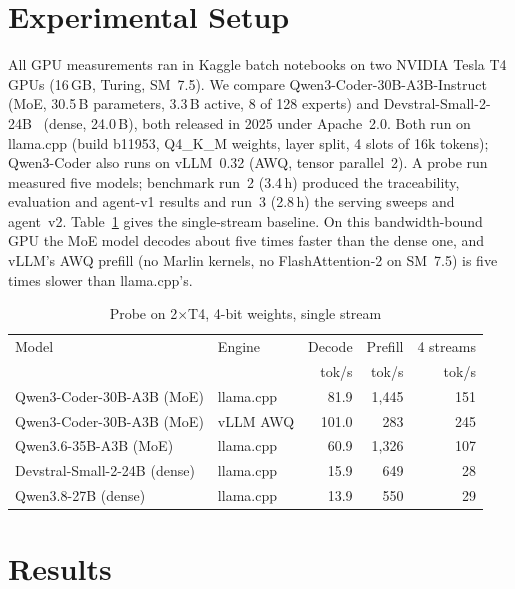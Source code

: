 \documentclass[conference]{IEEEtran}
\begin{document}
\section{Experimental Setup}
All GPU measurements ran in Kaggle batch notebooks on two NVIDIA Tesla T4 GPUs (16\,GB, Turing, SM~7.5).
We compare Qwen3-Coder-30B-A3B-Instruct~\cite{yang2025qwen3} (MoE, 30.5\,B parameters, 3.3\,B active, 8 of 128
experts) and Devstral-Small-2-24B~\cite{mistral2025devstral2} (dense, 24.0\,B), both released in 2025 under
Apache~2.0. Both run on llama.cpp (build b11953, Q4\_K\_M weights, layer split, 4 slots of 16k tokens); Qwen3-Coder
also runs on vLLM~0.32 (AWQ, tensor parallel~2). A probe run measured five models; benchmark run~2 (3.4\,h)
produced the traceability, evaluation and agent-v1 results and run~3 (2.8\,h) the serving sweeps and agent~v2.
Table~\ref{tab:probe} gives the single-stream baseline. On this bandwidth-bound GPU the MoE model decodes about
five times faster than the dense one, and vLLM's AWQ prefill (no Marlin kernels, no FlashAttention-2 on SM~7.5) is
five times slower than llama.cpp's.

\begin{table}[t]
\caption{Probe on 2$\times$T4, 4-bit weights, single stream}
\label{tab:probe}
\centering
\footnotesize
\setlength{\tabcolsep}{3.2pt}
\begin{tabular}{@{}llrrr@{}}
\toprule
Model & Engine & Decode & Prefill & 4 streams \\
 & & tok/s & tok/s & tok/s \\
\midrule
Qwen3-Coder-30B-A3B (MoE) & llama.cpp & 81.9 & 1{,}445 & 151 \\
Qwen3-Coder-30B-A3B (MoE) & vLLM AWQ & 101.0 & 283 & 245 \\
Qwen3.6-35B-A3B (MoE) & llama.cpp & 60.9 & 1{,}326 & 107 \\
Devstral-Small-2-24B (dense) & llama.cpp & 15.9 & 649 & 28 \\
Qwen3.8-27B (dense) & llama.cpp & 13.9 & 550 & 29 \\
\bottomrule
\end{tabular}
\end{table}

\section{Results}
\end{document}
